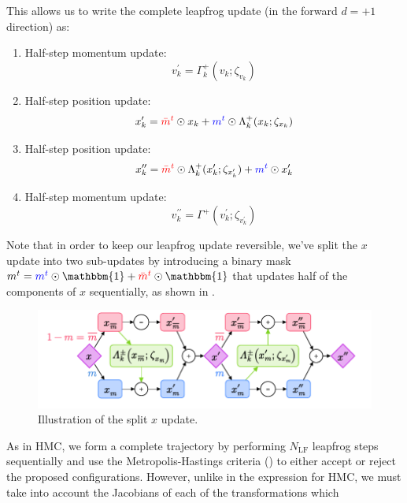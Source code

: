\documentclass{article} %
\newcommand{\mbart}{\textcolor{red}{\bar{m}^{t}}}
\newcommand{\mt}{\textcolor{blue}{m^{t}}}
\begin{document}
This allows us to write the complete leapfrog update (in the forward \(d=+1\) direction) as:
%
\begin{enumerate}
   \item Half-step momentum update:
      \begin{equation}
         v^{\prime}_{k} = \Gamma^{+}_{k}(v_{k};\zeta_{v_{k}})
      \end{equation}
   \item Half-step position update:
      \begin{equation}
         x^{\prime}_{k} = \mbart\odot x_{k} + \mt\odot \Lambda^{+}_{k}(x_{k};\zeta_{x_{k}})
      \end{equation}
   \item Half-step position update:
      \begin{equation}
         x^{\prime\prime}_{k} = \mbart\odot\Lambda^{+}_{k}(x^{\prime}_{k};\zeta_{x^{\prime}_{k}}) + \mt\odot x^{\prime}_{k}
      \end{equation}
   \item Half-step momentum update:
      \begin{equation}
         v^{\prime\prime}_{k} = \Gamma^{+}(v^{\prime}_{k}; \zeta_{v^{\prime}_{k}})
      \end{equation}
\end{enumerate}
%
Note that in order to keep our leapfrog update reversible, we've split the \(x\) update into two sub-updates by
introducing a binary mask \(m^{t} = \mt\odot\mathbbm{1} + \mbart\odot\mathbbm{1}\) that updates half of the components
of \(x\) sequentially, as shown in .
%
\begin{figure}[htpb]
   \centering
   \includegraphics[width=\textwidth]{figures/splitx.pdf}
   \caption{\label{fig:splitx}Illustration of the split \(x\) update.}
\end{figure}
%
As in HMC, we form a complete trajectory by performing \(N_{\mathrm{LF}}\) leapfrog steps sequentially and use the
Metropolis-Hastings criteria () to either accept or reject the proposed configurations.
%
However, unlike in the expression for HMC, we must take into account the Jacobians of each of the transformations which
\end{document}
